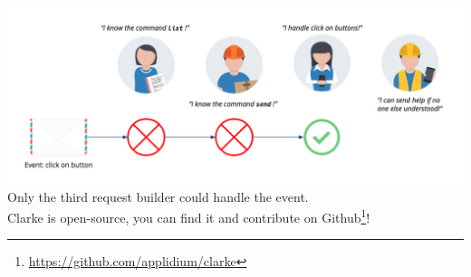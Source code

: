 \documentclass{article}
\begin{document}
\includegraphics[scale=0.3]{images/jamy_request_builders.png}
\newline
Only the third request builder could handle the event.\\
\newline
Clarke is open-source, you can find it and contribute on Github\footnote{\url{https://github.com/applidium/clarke}}!
\newpage
\end{document}
